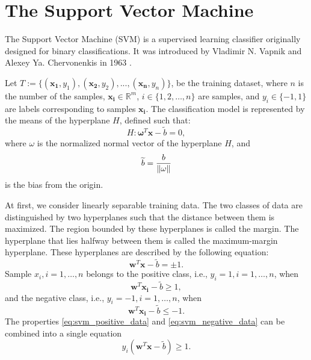 \section{The Support Vector Machine}
The Support Vector Machine (SVM) is a supervised learning classifier originally designed for binary classifications. It was introduced by Vladimir N. Vapnik and Alexey Ya. Chervonenkis in 1963 \cite{Cortes1995}.

Let \( T := \{(\boldsymbol{x_1}, y_1),(\boldsymbol{x_2}, y_2),...,(\boldsymbol{x_n}, y_n)\} \),
be the training dataset, where $n$ is the number of the samples, \( \boldsymbol{x_i} \in \mathbb{R}^m \), \( i \in \{1,2,\dots,n\} \)
are samples, and \( y_i \in \{-1, 1\} \) are labels corresponding to samples \( \boldsymbol{x_i} \). The classification model is represented by the means of the hyperplane \( H \), defined such that:
\begin{equation}
    H: \boldsymbol{\omega}^T\boldsymbol{x}-\widetilde{b}=0,
    \label{eq:svm:hyperplane}
\end{equation}
where \( \omega \) is the normalized normal vector of the hyperplane \( H \), and
\begin{equation}
    \widetilde{b} = \frac{b}{\left\lVert\omega\right\rVert}
    \label{eq:svm:offset}
\end{equation}
is the bias from the origin.

At first, we consider linearly separable training data. The two classes of data are distinguished by two hyperplanes such that the distance between them is maximized. The region bounded by these hyperplanes is called the margin. The hyperplane that lies halfway between them is called the maximum-margin hyperplane. These hyperplanes are described by the following equation:
\begin{equation}
    \boldsymbol{w}^T\boldsymbol{x}-\widetilde{b}=\pm1.
    \label{eq:svm_hyperplanes}
\end{equation}
Sample $x_i, i=1,\dots,n$ belongs to the positive class, i.e., $y_i = 1, i=1,\dots,n$, when
\begin{equation}
    \boldsymbol{w}^T\boldsymbol{x_i}-\widetilde{b}\geq1,
    \label{eq:svm_positive_data}
\end{equation}
and the negative class, i.e., $y_i = -1, i=1,\dots,n$, when
\begin{equation}
    \boldsymbol{w}^T\boldsymbol{x_i}-\widetilde{b}\leq-1.
    \label{eq:svm_negative_data}
\end{equation}
The properties \eqref{eq:svm_positive_data} and \eqref{eq:svm_negative_data} can be combined into a single equation
\begin{equation}
    y_i(\boldsymbol{w}^T\boldsymbol{x}-\widetilde{b})\geq1.
\end{equation}

